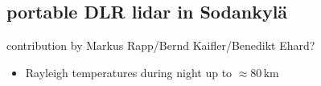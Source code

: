 \subsection{portable DLR lidar in Sodankyl\"a}
contribution by Markus Rapp/Bernd Kaifler/Benedikt Ehard?

\begin{itemize}
  \item Rayleigh temperatures during night up to $\approx 80$\,km
\end{itemize}
